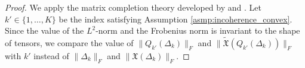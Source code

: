 \begin{proof}

We apply the matrix completion theory developed by \cite{candes2010matrix} and \cite{candes2012exact}.
Let $k' \in \{1,\ldots,K\}$ be the index satisfying Assumption \ref{asmp:incoherence_convex}.
Since the value of the $L^2$-norm and the Frobenius norm is invariant to the shape of tensors, we compare the value of $\|Q_{k'}(\Delta_k)\|_F$ and $\|\tilde{\mathfrak{X}}(Q_{k'}(\Delta_k))\|_F$ with $k'$ instead of $\|\Delta_k\|_F$ and $\|\mathfrak{X}(\Delta_k)\|_F$.


\end{proof}
